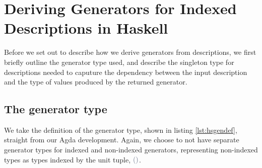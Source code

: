 \documentclass[a4paper,msc,twosized=semi]{uustthesis}
\newcommand*{\mathcolor}{}
\def\mathcolor#1#{\mathcoloraux{#1}}
\newcommand*{\mathcoloraux}[3]{%
  \protect\leavevmode
  \begingroup
    \color#1{#2}#3%
  \endgroup
}
\newcommand{\HSSpecial}[1]{\mathcolor{hsblue4}{#1}}
\begin{document}
\section{Deriving Generators for Indexed Descriptions in Haskell}

  Before we set out to describe how we derive generators from descriptions, we first briefly outline the generator type used, and describe the singleton type for descriptions needed to caputure the dependency between the input description and the type of values produced by the returned generator. 

\subsection{The generator type}

  We take the definition of the generator type, shown in listing \ref{lst:hsgendef}, straight from our Agda development. Again, we choose to not have separate generator types for indexed and non-indexed generators, representing non-indexed types as types indexed by the unit tuple, \ensuremath{\HSSpecial{(}\HSSpecial{)}}. 
\end{document}
